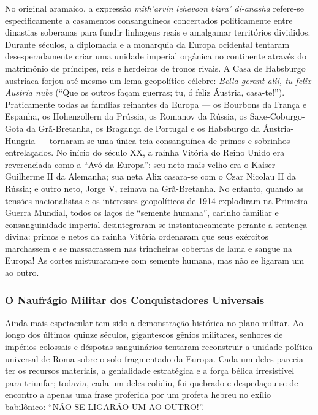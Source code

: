 No original aramaico, a expressão \textit{mith'arvin lehevoon bizra' di-anasha} refere-se especificamente a casamentos consanguíneos concertados politicamente entre dinastias soberanas para fundir linhagens reais e amalgamar territórios divididos.
Durante séculos, a diplomacia e a monarquia da Europa ocidental tentaram desesperadamente criar uma unidade imperial orgânica no continente através do matrimônio de príncipes, reis e herdeiros de tronos rivais.
A Casa de Habsburgo austríaca forjou até mesmo um lema geopolítico célebre: \textit{Bella gerant alii, tu felix Austria nube} (``Que os outros façam guerras; tu, ó feliz Áustria, casa-te!''). Praticamente todas as famílias reinantes da Europa — os Bourbons da França e Espanha, os Hohenzollern da Prússia, os Romanov da Rússia, os Saxe-Coburgo-Gota da Grã-Bretanha, os Bragança de Portugal e os Habsburgo da Áustria-Hungria — tornaram-se uma única teia consanguínea de primos e sobrinhos entrelaçados.
No início do século XX, a rainha Vitória do Reino Unido era reverenciada como a ``Avó da Europa'': seu neto mais velho era o Kaiser Guilherme II da Alemanha; sua neta Alix casara-se com o Czar Nicolau II da Rússia; e outro neto, Jorge V, reinava na Grã-Bretanha. No entanto, quando as tensões nacionalistas e os interesses geopolíticos de 1914 explodiram na Primeira Guerra Mundial, todos os laços de ``semente humana'', carinho familiar e consanguinidade imperial desintegraram-se instantaneamente perante a sentença divina: primos e netos da rainha Vitória ordenaram que seus exércitos marchassem e se massacrassem nas trincheiras cobertas de lama e sangue na Europa! As cortes misturaram-se com semente humana, mas não se ligaram um ao outro.


\subsubsection*{O Naufrágio Militar dos Conquistadores Universais}
Ainda mais espetacular tem sido a demonstração histórica no plano militar. Ao longo dos últimos quinze séculos, gigantescos gênios militares, senhores de impérios colossais e déspotas sanguinários tentaram reconstruir a unidade política universal de Roma sobre o solo fragmentado da Europa. Cada um deles parecia ter os recursos materiais, a genialidade estratégica e a força bélica irresistível para triunfar; todavia, cada um deles colidiu, foi quebrado e despedaçou-se de encontro a apenas uma frase proferida por um profeta hebreu no exílio babilônico: ``NÃO SE LIGARÃO UM AO OUTRO!''.

